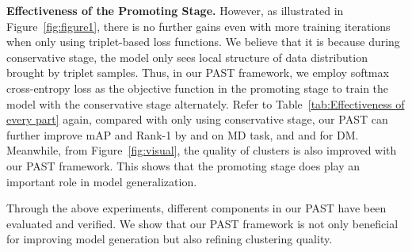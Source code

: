\documentclass[10pt,twocolumn,letterpaper]{article}
\begin{document}
\textbf{Effectiveness of the Promoting Stage.} However, as illustrated in Figure~\ref{fig:figure1}, there is no further gains even with more training iterations when only using triplet-based loss functions. We believe that it is because during conservative stage, the model only 
sees local structure of data distribution brought by triplet samples. Thus, in our PAST framework, we employ softmax cross-entropy loss as the objective function in the promoting stage to train the model with the conservative stage alternately. Refer to Table~\ref{tab:Effectiveness of every part} again, compared with only using conservative stage, our PAST can further improve mAP and Rank-1 by  and  on MD task, and  and  for DM. Meanwhile, from Figure~\ref{fig:visual}, the quality of clusters is also improved with our PAST framework. This shows that the promoting stage does play an important role in model generalization. 

Through the above experiments, different components in our PAST have been evaluated and verified. We show that our PAST framework is not only beneficial for improving model generation but also refining clustering quality.
\begin{table}
\footnotesize
\setlength{\belowcaptionskip}{-0.2cm}
\setlength{\abovecaptionskip}{-0cm}
\begin{center}
\end{center}
\caption{The comparison of different clustering methods. \textbf{K}, \textbf{D} and \textbf{H} represents K-means, DBSCAN~\cite{DBSCAN} and HDBSCANRank1{HDBSCAN} clustering method respectively.}
\label{tab:The comparison of different clustering methods}
\end{table}
\end{document}

